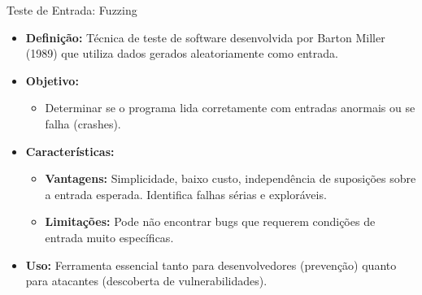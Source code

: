 \begin{frame}{Teste de Entrada: Fuzzing}
    \begin{itemize}
        \item \textbf{Definição:} Técnica de teste de software desenvolvida por Barton Miller (1989) que utiliza dados gerados aleatoriamente como entrada.

        \item \textbf{Objetivo:}
              \begin{itemize}
                  \item Determinar se o programa lida corretamente com entradas anormais ou se falha (crashes).
              \end{itemize}

        \item \textbf{Características:}
              \begin{itemize}
                  \item \textbf{Vantagens:} Simplicidade, baixo custo, independência de suposições sobre a entrada esperada. Identifica falhas sérias e exploráveis.
                  \item \textbf{Limitações:} Pode não encontrar bugs que requerem condições de entrada muito específicas.
              \end{itemize}

        \item \textbf{Uso:} Ferramenta essencial tanto para desenvolvedores (prevenção) quanto para atacantes (descoberta de vulnerabilidades).
    \end{itemize}
\end{frame}

